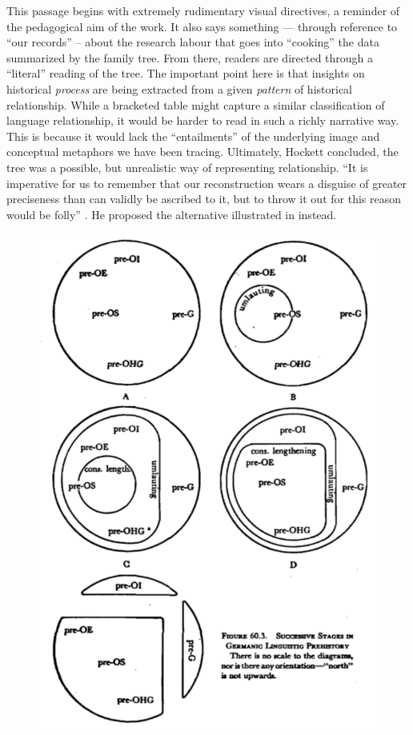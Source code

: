 \documentclass[output=paper]{langscibook}
\begin{document}
This passage begins with extremely rudimentary visual directives, a reminder of the pedagogical aim of the work. It also says something — through reference to ``our records'' -- about the research labour that goes into ``cooking'' the data summarized by the family tree. From there, readers are directed through a ``literal'' reading of the tree. The important point here is that insights on historical \emph{process} are being extracted from a given \emph{pattern} of historical relationship. While a bracketed table might capture a similar classification of language relationship, it would be harder to read in such a richly narrative way. This is because it would lack the ``entailments'' of the underlying image and conceptual metaphors we have been tracing. Ultimately, Hockett concluded, the tree was a possible, but unrealistic way of representing relationship. ``It is imperative for us to remember that our reconstruction wears a disguise of greater preciseness than can validly be ascribed to it, but to throw it out for this reason would be folly'' \citep[523]{Hockett19591958}. He proposed the alternative illustrated in  instead.

\begin{figure}
    \centering
    \includegraphics[scale=0.5]{figures/hockett1958-520-new.png}
    \caption{\citet[520]{Hockett19591958}}
    \label{fig:kaplan:hockett1959520}
\end{figure}
\end{document}
